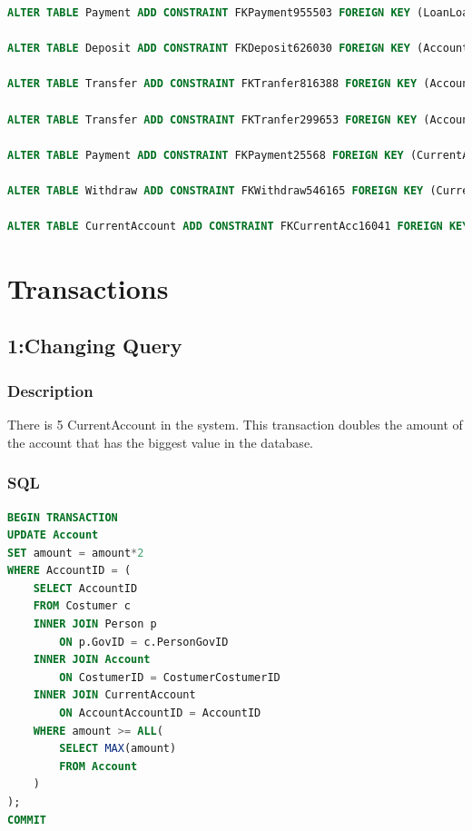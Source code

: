 \documentclass[a4paper, 10pt]{article}
\begin{document}
\begin{lstlisting}[language=SQL]
ALTER TABLE Payment ADD CONSTRAINT FKPayment955503 FOREIGN KEY (LoanLoanID) REFERENCES Loan (LoanID);

ALTER TABLE Deposit ADD CONSTRAINT FKDeposit626030 FOREIGN KEY (AccountAccountID) REFERENCES Account (AccountID);

ALTER TABLE Transfer ADD CONSTRAINT FKTranfer816388 FOREIGN KEY (AccountAccountID) REFERENCES Account (AccountID);

ALTER TABLE Transfer ADD CONSTRAINT FKTranfer299653 FOREIGN KEY (AccountAccountID2) REFERENCES Account (AccountID);

ALTER TABLE Payment ADD CONSTRAINT FKPayment25568 FOREIGN KEY (CurrentAccountAccountID) REFERENCES CurrentAccount (AccountAccountID);

ALTER TABLE Withdraw ADD CONSTRAINT FKWithdraw546165 FOREIGN KEY (CurrentAccountAccountID) REFERENCES CurrentAccount (AccountAccountID);

ALTER TABLE CurrentAccount ADD CONSTRAINT FKCurrentAcc16041 FOREIGN KEY (AccountAccountID) REFERENCES Account (AccountID);
\end{lstlisting}

\section{Transactions}

\subsection{1:Changing Query}
\subsubsection{Description}
There is 5 CurrentAccount in the system. This transaction doubles the amount of the account that has the biggest value in the database.

\subsubsection{SQL}
\begin{lstlisting}[language=SQL]
BEGIN TRANSACTION
UPDATE Account 
SET amount = amount*2 
WHERE AccountID = (
    SELECT AccountID 
    FROM Costumer c 
    INNER JOIN Person p 
        ON p.GovID = c.PersonGovID 
    INNER JOIN Account 
        ON CostumerID = CostumerCostumerID 
    INNER JOIN CurrentAccount 
        ON AccountAccountID = AccountID 
    WHERE amount >= ALL(
        SELECT MAX(amount) 
        FROM Account 
    )
);
COMMIT
\end{lstlisting}
\end{document}
